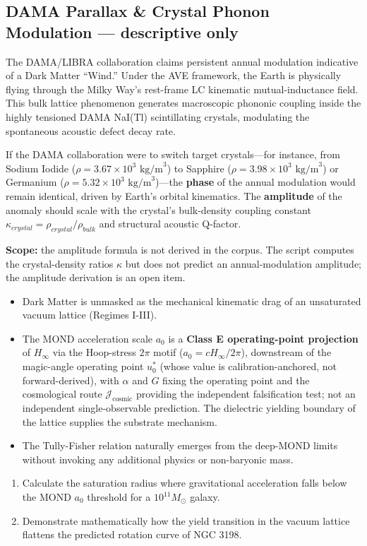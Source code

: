 \subsection{DAMA Parallax \& Crystal Phonon Modulation --- descriptive only}
The DAMA/LIBRA collaboration claims persistent annual modulation indicative of a Dark Matter ``Wind.'' Under the AVE framework, the Earth is physically flying through the Milky Way's rest-frame LC kinematic mutual-inductance field. This bulk lattice phenomenon generates macroscopic phononic coupling inside the highly tensioned DAMA NaI(Tl) scintillating crystals, modulating the spontaneous acoustic defect decay rate.

If the DAMA collaboration were to switch target crystals---for instance, from Sodium Iodide ($\rho = 3.67 \times 10^3 \text{ kg/m}^3$) to Sapphire ($\rho = 3.98 \times 10^3\text{ kg/m}^3$) or Germanium ($\rho = 5.32 \times 10^3\text{ kg/m}^3$)---the \textbf{phase} of the annual modulation would remain identical, driven by Earth's orbital kinematics. The \textbf{amplitude} of the anomaly should scale with the crystal's bulk-density coupling constant $\kappa_{crystal} = \rho_{crystal}/\rho_{bulk}$ and structural acoustic Q-factor.

\textbf{Scope:} the amplitude formula is not derived in the corpus. The script  computes the crystal-density ratios $\kappa$ but does not predict an annual-modulation amplitude; the amplitude derivation is an open item.

\begin{summarybox}
\begin{itemize}
    \item Dark Matter is unmasked as the mechanical kinematic drag of an unsaturated vacuum lattice (Regimes I-III).
    \item The MOND acceleration scale $a_0$ is a \textbf{Class E operating-point projection} of $H_\infty$ via the Hoop-stress $2\pi$ motif ($a_0 = c H_\infty / 2\pi$), downstream of the magic-angle operating point $u_0^*$ (whose value is calibration-anchored, not forward-derived), with $\alpha$ and $G$ fixing the operating point and the cosmological route $\mathcal{J}_{\text{cosmic}}$ providing the independent falsification test; not an independent single-observable prediction. The dielectric yielding boundary of the lattice supplies the substrate mechanism.
    \item The Tully-Fisher relation naturally emerges from the deep-MOND limits without invoking any additional physics or non-baryonic mass.
\end{itemize}
\end{summarybox}

\begin{exercisebox}
\begin{enumerate}
    \item Calculate the saturation radius where gravitational acceleration falls below the MOND $a_0$ threshold for a $10^{11} M_\odot$ galaxy.
    \item Demonstrate mathematically how the yield transition in the vacuum lattice flattens the predicted rotation curve of NGC 3198.
\end{enumerate}
\end{exercisebox}
